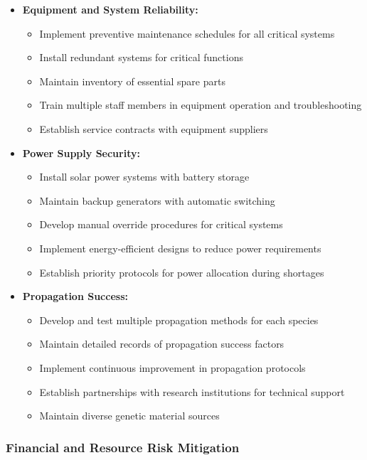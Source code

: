 \begin{itemize}
    \item \textbf{Equipment and System Reliability:}
    \begin{itemize}
        \item Implement preventive maintenance schedules for all critical systems
        \item Install redundant systems for critical functions
        \item Maintain inventory of essential spare parts
        \item Train multiple staff members in equipment operation and troubleshooting
        \item Establish service contracts with equipment suppliers
    \end{itemize}
    
    \item \textbf{Power Supply Security:}
    \begin{itemize}
        \item Install solar power systems with battery storage
        \item Maintain backup generators with automatic switching
        \item Develop manual override procedures for critical systems
        \item Implement energy-efficient designs to reduce power requirements
        \item Establish priority protocols for power allocation during shortages
    \end{itemize}
    
    \item \textbf{Propagation Success:}
    \begin{itemize}
        \item Develop and test multiple propagation methods for each species
        \item Maintain detailed records of propagation success factors
        \item Implement continuous improvement in propagation protocols
        \item Establish partnerships with research institutions for technical support
        \item Maintain diverse genetic material sources
    \end{itemize}
\end{itemize}

\subsubsection{Financial and Resource Risk Mitigation}

